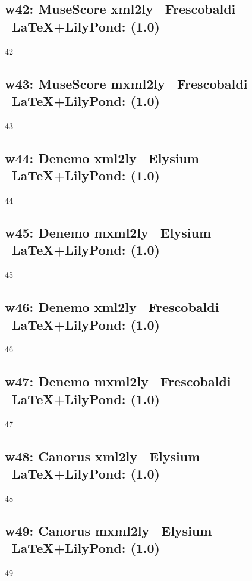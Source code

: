 \subsection{w42: MuseScore \ra xml2ly \ra\ Frescobaldi \ra\ \LaTeX+LilyPond: (1.0)} 

42

\subsection{w43: MuseScore \ra mxml2ly \ra\ Frescobaldi \ra\ \LaTeX+LilyPond: (1.0)} 

43

\subsection{w44: Denemo \ra xml2ly \ra\ Elysium \ra\ \LaTeX+LilyPond: (1.0)} 

44

\subsection{w45: Denemo \ra mxml2ly \ra\ Elysium \ra\ \LaTeX+LilyPond: (1.0)} 

45

\subsection{w46: Denemo \ra xml2ly \ra\ Frescobaldi \ra\ \LaTeX+LilyPond: (1.0)}

46

\subsection{w47: Denemo \ra mxml2ly \ra\ Frescobaldi \ra\ \LaTeX+LilyPond: (1.0)}

47

\subsection{w48: Canorus \ra xml2ly \ra\ Elysium \ra\ \LaTeX+LilyPond: (1.0)}

48

\subsection{w49: Canorus \ra mxml2ly \ra\ Elysium \ra\ \LaTeX+LilyPond: (1.0)}

49


